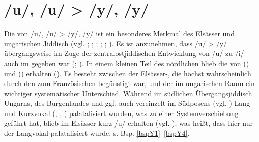  \section{ /u/, /u\textlengthmark/ > /y/, /y\textlengthmark/}\label{phonpalat}
 Die  von /u/, /u\textlengthmark/ > /y/, /y\textlengthmark/ ist ein besonderes Merkmal des Elsässer und ungarischen Jiddisch (vgl. \cite{Birnbaum1934}; \cite[108]{GuggenheimGruenberg1973}; \cite[1027]{Katz1983}; \cite[171f]{Timm1987}; \cite{Hutterer1965}; \cite[83]{Herzog1992}). Es ist anzunehmen, dass /u\textlengthmark/ > /y/ übergangsweise im Zuge der zentralostjiddischen Entwicklung von /u\textlengthmark/ zu /i/ auch im  gegeben war (\cite{Birnbaum1934}; \cite[1029]{Katz1983}). In einem kleinen Teil des nördlichen  blieb die  von  () und  () erhalten (\cite[83]{Herzog1992}). Es besteht zwischen der Elsässer-, die höchst wahrscheinlich durch den  zum Französischen begünstigt war, und der  im ungarischen Raum ein wichtiger systematischer Unterschied. Während im südlichen Übergangsjiddisch Ungarns, des Burgenlandes und ggf. auch vereinzelt im  Südposens  (vgl. \cite{FleischerSchaeferErsch}) Lang- und Kurzvokal (, , ) palatalisiert wurden, was zu einer Systemverschiebung geführt hat, blieb im Elsässer  kurz /u/ erhalten (vgl. \cite{Birnbaum1934}); was heißt, dass hier nur der Langvokal palatalisiert wurde, s. Bsp. \ref{bspY1}--\ref{bspY4}.\\
 


